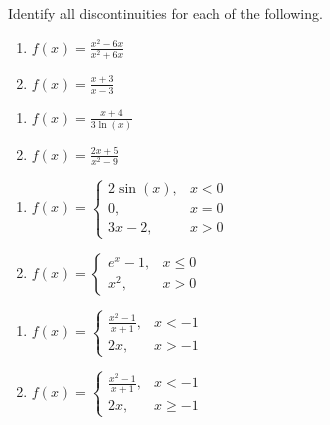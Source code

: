 Identify all discontinuities for each of the following.
\begin{multicols}{2}
\begin{enumerate}		\setcounter{enumi}{\value{Review}}
	\item $f(x) = \frac{x^2-6x}{x^2+6x}$
	\item $f(x) = \frac{x+3}{x-3}$
\end{enumerate}	\setcounter{Review}{\value{enumi}}
\end{multicols}
\begin{multicols}{2}
\begin{enumerate}	\setcounter{enumi}{\value{Review}}
	\item $f(x) = \frac{x+4}{3\ln(x)}$
	\item $f(x) = \frac{2x+5}{x^2-9}$
\end{enumerate}	\setcounter{Review}{\value{enumi}}
\end{multicols}
\begin{multicols}{2}
\begin{enumerate}	\setcounter{enumi}{\value{Review}}
	\item $f(x) = \begin{cases} 
			2 \sin(x), & x < 0 \\
			0, & x = 0 \\
			3x-2, & x > 0	\end{cases}$
	\item $f(x) = \begin{cases}
	e^x - 1, & x \leq 0 \\
	x^2, & x > 0 \end{cases}$
\end{enumerate}	\setcounter{Review}{\value{enumi}}
\end{multicols}
\begin{multicols}{2}
\begin{enumerate}	\setcounter{enumi}{\value{Review}}
	\item $f(x) = \begin{cases}
		\frac{x^2-1}{x+1}, & x < -1 \\
		2x, & x > -1 \end{cases}$
	\item $f(x) = \begin{cases}
		\frac{x^2-1}{x+1}, & x < -1 \\
		2x, & x \geq -1 \end{cases}$
\end{enumerate}
\end{multicols}

